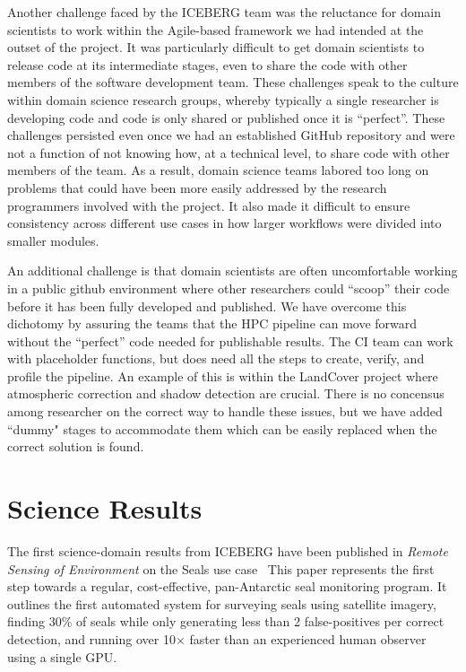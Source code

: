 \documentclass[manuscript,screen]{acmart}
\begin{document}
Another challenge faced by the ICEBERG team was the reluctance for 
domain scientists to work within the Agile-based framework we had intended 
at the outset of the project. It was particularly difficult to get domain 
scientists to release code at its intermediate stages, even to share the 
code with other members of the software development team. These challenges 
speak to the culture within domain science research groups, whereby 
typically a single researcher is developing code and code is only shared or 
published once it is ``perfect''. These challenges persisted even once we 
had an established GitHub repository and were not a function of not knowing 
how, at a technical level, to share code with other members of the team. As 
a result, domain science teams labored too long on problems that could have 
been more easily addressed by the research programmers involved with the 
project. It also made it difficult to ensure consistency across different 
use cases in how larger workflows were divided into smaller modules. 

An 
additional challenge is that domain scientists are often uncomfortable 
working in a public github environment where other researchers could 
``scoop'' their code before it has been fully developed and published.
We have overcome this dichotomy by assuring the teams that the HPC pipeline
can move forward without the ``perfect'' code needed for publishable results.
The CI team can work with placeholder functions, but does need all the steps 
to create, verify, and profile the pipeline.  An example of this is within 
the LandCover project where atmospheric correction and shadow detection are 
crucial.  There is no concensus among researcher on the correct way to 
handle these issues, but we have added ``dummy" stages to accommodate them 
which can be easily replaced when the correct solution is found. 

\section{Science Results}
The first science-domain results from ICEBERG have been published in {\textsl{Remote Sensing of Environment}} on the Seals use case~\cite{BCG:20}
This paper represents the first step towards a regular, cost-effective, pan-Antarctic seal monitoring program.  It outlines the first automated system for surveying seals using satellite imagery, 
finding 30\% of seals while only generating less than 2 false-positives per correct detection, and running
over 10× faster than an experienced human observer using a single GPU.
\end{document}

